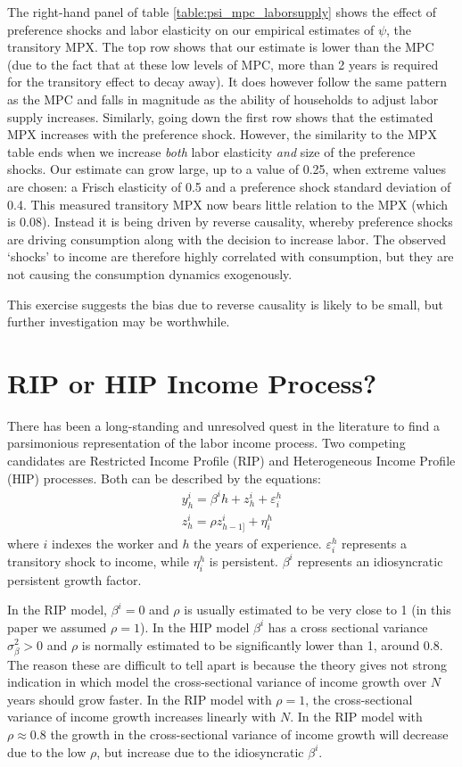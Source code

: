 \documentclass[titlepage]{\econtex}\newcommand{\texname}{ConsumptionHeterogeneity}
\begin{document}
The right-hand panel of table \ref{table:psi_mpc_laborsupply} shows the effect of preference shocks and labor elasticity on our empirical estimates of $\psi$, the transitory MPX. The top row shows that our estimate is lower than the MPC (due to the fact that at these low levels of MPC, more than 2 years is required for the transitory effect to decay away). It does however follow the same pattern as the MPC and falls in magnitude as the ability of households to adjust labor supply increases. Similarly, going down the first row shows that the estimated MPX increases with the preference shock. However, the similarity to the MPX table ends when we increase \textit{both} labor elasticity \textit{and} size of the preference shocks. Our estimate can grow large, up to a value of 0.25, when extreme values are chosen: a Frisch elasticity of 0.5 and a preference shock standard deviation of 0.4. This measured transitory MPX now bears little relation to the MPX (which is 0.08). Instead it is being driven by reverse causality, whereby preference shocks are driving consumption along with the decision to increase labor. The observed `shocks' to income are therefore highly correlated with consumption, but they are not causing the consumption dynamics exogenously.

This exercise suggests the bias due to reverse causality is likely to be small, but further investigation may be worthwhile.

\section{RIP or HIP Income Process?} \label{rip_hip_appendix}
\setcounter{figure}{0}   
\setcounter{table}{0} 
There has been a long-standing and unresolved quest in the literature to find a parsimonious representation of the labor income process. Two competing candidates are Restricted Income Profile (RIP) and Heterogeneous Income Profile (HIP) processes. Both can be described by the equations:
\begin{align*}
	y_h^i = \beta^i h + z^i_h + \varepsilon^h_i\\
	z^i_h = \rho z^i_{h-1]} + \eta^h_i
\end{align*}
where $i$ indexes the worker and $h$ the years of experience. $\varepsilon^h_i$ represents a transitory shock to income, while $\eta^h_i$ is persistent. $\beta^i$ represents an idiosyncratic persistent growth factor.

In the RIP model, $\beta^i=0$ and $\rho$ is usually estimated to be very close to 1 (in this paper we assumed $\rho=1$). In the HIP model $\beta^i$ has a cross sectional variance $\sigma_{\beta}^2>0$ and $\rho$ is normally estimated to be significantly lower than 1, around 0.8. The reason these are difficult to tell apart is because the theory gives not strong indication in which model the cross-sectional variance of income growth over $N$ years should grow faster. In the RIP model with $\rho=1$, the cross-sectional variance of income growth increases linearly with $N$. In the RIP model with $\rho\approx 0.8$ the growth in the  cross-sectional variance of income growth will decrease due to the low $\rho$, but increase due to the idiosyncratic $\beta^i$.
\end{document}
